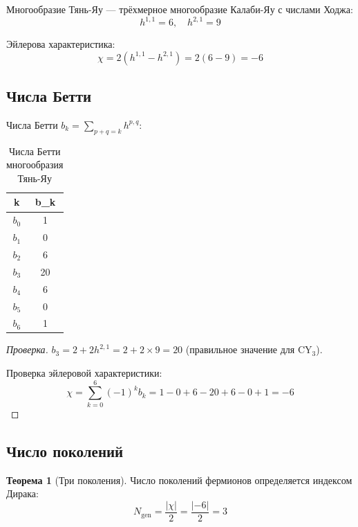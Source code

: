 \documentclass[12pt,a4paper,twoside]{article}
\theoremstyle{definition}
\newtheorem{theorem}{Теорема}[section]
\begin{document}
Многообразие Тянь-Яу \cite{Tian:1986} — трёхмерное многообразие Калаби-Яу с числами Ходжа:
\begin{equation}
h^{1,1} = 6, \quad h^{2,1} = 9
\label{eq:hodge}
\end{equation}

Эйлерова характеристика:
\begin{equation}
\chi = 2(h^{1,1} - h^{2,1}) = 2(6 - 9) = -6
\label{eq:euler}
\end{equation}

\subsection{Числа Бетти}

Числа Бетти $b_k = \sum_{p+q=k} h^{p,q}$:

\begin{table}[H]
\centering
\small
\caption{Числа Бетти многообразия Тянь-Яу}
\label{tab:betti}
\begin{tabular}{c|c}
\toprule
\textbf{k} & \textbf{b\_k} \\
\midrule
$b_0$ & 1 \\
$b_1$ & 0 \\
$b_2$ & 6 \\
$b_3$ & 20 \\
$b_4$ & 6 \\
$b_5$ & 0 \\
$b_6$ & 1 \\
\bottomrule
\end{tabular}
\end{table}

\begin{proof}[Проверка]
$b_3 = 2 + 2h^{2,1} = 2 + 2 \times 9 = 20$ (правильное значение для CY$_3$).

Проверка эйлеровой характеристики:
\begin{equation}
\chi = \sum_{k=0}^{6} (-1)^k b_k = 1 - 0 + 6 - 20 + 6 - 0 + 1 = -6
\end{equation}
\end{proof}

\subsection{Число поколений}

\begin{theorem}[Три поколения]
Число поколений фермионов определяется индексом Дирака:
\begin{equation}
\boxed{
N_{\text{gen}} = \frac{|\chi|}{2} = \frac{|-6|}{2} = 3
}
\label{eq:generations}
\end{equation}
\end{theorem}
\end{document}
